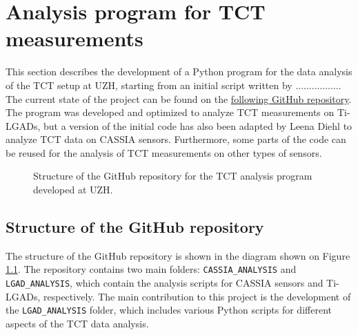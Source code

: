 \chapter{Analysis program for TCT measurements}
\label{chap2}

This section describes the development of a Python program for the data analysis of the TCT setup at UZH, starting from an initial script written by ................. The current state of the project can be found on the \href{https://github.com/Anolis27/TCT_Analysis_UZH_setup}{following GitHub repository}. The program was developed and optimized to analyze TCT measurements on Ti-LGADs, but a version of the initial code has also been adapted by Leena Diehl to analyze TCT data on CASSIA sensors. Furthermore, some parts of the code can be reused for the analysis of TCT measurements on other types of sensors.

\begin{figure}[h!]
  \centering
  \caption{Structure of the GitHub repository for the TCT analysis program developed at UZH.}
  \label{fig:repo_structure}
\end{figure}

\section{Structure of the GitHub repository}

The structure of the GitHub repository is shown in the diagram shown on Figure \ref{fig:repo_structure}. The repository contains two main folders: \texttt{CASSIA\_ANALYSIS} and \texttt{LGAD\_ANALYSIS}, which contain the analysis scripts for CASSIA sensors and Ti-LGADs, respectively. The main contribution to this project is the development of the \texttt{LGAD\_ANALYSIS} folder, which includes various Python scripts for different aspects of the TCT data analysis. 


